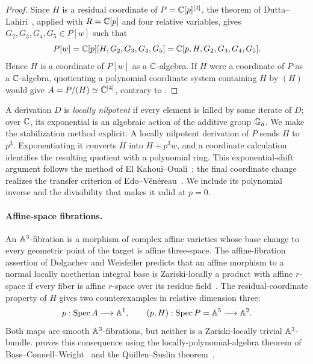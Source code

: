 \begin{proof}
Since $H$ is a residual coordinate of $P=\mathbb C[p]^{[4]}$, the theorem of
Dutta--Lahiri~\cite[Theorem~3.4]{DuttaLahiri}, applied with $R=\mathbb C[p]$
and four relative variables, gives $G_2,G_3,G_4,G_5\in P[w]$ such that
\[
 P[w]=\mathbb C[p][H,G_2,G_3,G_4,G_5]
     =\mathbb C[p,H,G_2,G_3,G_4,G_5].
\]
Hence $H$ is a coordinate of $P[w]$ as a $\mathbb C$-algebra. If $H$ were a
coordinate of $P$ as a $\mathbb C$-algebra, quotienting a polynomial
coordinate system containing $H$ by $(H)$ would give
$A=P/(H)\simeq\mathbb C^{[4]}$, contrary to .
\end{proof}

A derivation $D$ is \emph{locally nilpotent} if every element is killed
by some iterate of $D$; over $\mathbb C$, its exponential is an algebraic
action of the additive group $\mathbb G_a$. We make the stabilization method
explicit. A locally nilpotent derivation of $P$
sends $H$ to $p^3$. Exponentiating it converts $H$ into $H+p^3w$,
and a coordinate calculation identifies the resulting quotient with a
polynomial ring. This exponential-shift argument follows the method of
El Kahoui--Ouali~\cite[Lemma~3.1 and proof of Theorem~1.1]{ElKahouiOuali};
the final coordinate change realizes the transfer criterion of
Edo--V\'en\'ereau~\cite[Theorem~7]{EdoVenereau}. We include its
polynomial inverse and the divisibility that makes it valid at $p=0$.

\paragraph{Affine-space fibrations.}
An $\mathbb A^3$-fibration is a morphism of complex affine varieties whose
base change to every geometric point of the target is affine three-space.
The affine-fibration assertion of Dolgachev and Weisfeiler predicts that
an affine morphism to a normal locally noetherian integral base is
Zariski-locally a product with affine $r$-space if every fiber is affine
$r$-space over its residue field~\cite[Section~3.8.5]{DolgachevWeisfeiler}.
The residual-coordinate property of $H$ gives two counterexamples in
relative dimension three:
\[
 p:\operatorname{Spec} A\longrightarrow\mathbb A^1,
 \qquad
 (p,H):\operatorname{Spec} P=\mathbb A^5\longrightarrow\mathbb A^2.
\]
Both maps are smooth $\mathbb A^3$-fibrations, but neither is a
Zariski-locally trivial $\mathbb A^3$-bundle. 
proves this consequence using the locally-polynomial-algebra theorem
of Bass--Connell--Wright~\cite[Theorem~3(a)]{BassConnellWright} and the
Quillen--Suslin theorem~\cite[Theorem~2(b)]{Suslin}.

